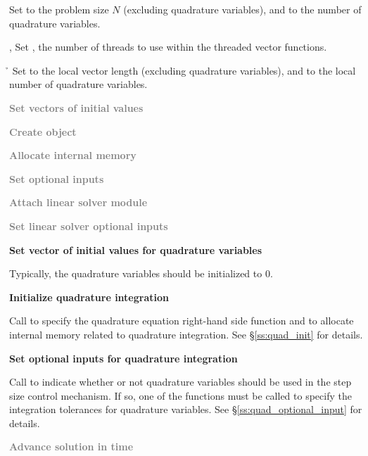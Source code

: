 {\begin{Steps}
  {\s} {\omp} {\pt} Set  to the problem size $N$ (excluding quadrature
  variables), and  to the number of quadrature variables.

  {\omp, \pt} Set , the number of threads to use within
  the threaded vector functions.

  {\p} {\h} Set  to the local vector length (excluding quadrature
  variables), and  to the local number of quadrature variables.
  
\item
  \textcolor{gray}{\bf Set vectors of initial values}
 
\item\label{i:quad_ida_create}
  \textcolor{gray}{\bf Create {\idas} object}

\item
  \textcolor{gray}{\bf Allocate internal memory}

\item
  \textcolor{gray}{\bf Set optional inputs}

\item
  \textcolor{gray}{\bf Attach linear solver module}

\item
  \textcolor{gray}{\bf Set linear solver optional inputs}

\item
  {\bf Set vector of initial values for quadrature variables}

  Typically, the quadrature variables should be initialized to $0$.

\item
  {\bf Initialize quadrature integration}

  Call  to specify the quadrature equation right-hand
  side function and to allocate internal memory related to quadrature integration. 
  See \S\ref{ss:quad_init} for details.

\item\label{i:quad_optional_inputs}
  {\bf Set optional inputs for quadrature integration}

  Call  to indicate whether or not quadrature variables
  should be used in the step size control mechanism. If so, one of the 
   functions  must be called to specify the integration 
  tolerances for quadrature variables.
  See \S\ref{ss:quad_optional_input} for details.

\item\label{i:quad_ida_solve}
  \textcolor{gray}{\bf Advance solution in time}


\end{Steps}}

